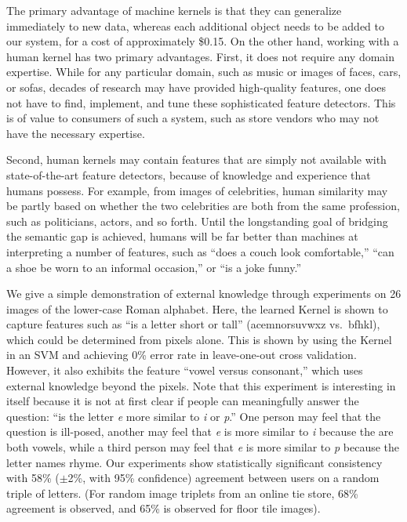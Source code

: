 \documentclass{article}
\begin{document}
The primary advantage of machine kernels is that they can generalize immediately to new data, whereas each additional object needs to be added to our system, for a cost of approximately \$0.15.  On the other hand, working with a human kernel has two primary advantages.  First, it does not require any domain expertise.  While for any particular domain, such as music or images of faces, cars, or sofas, decades of research may have provided high-quality features, one does not have to find, implement, and tune these sophisticated feature detectors.  This is of value to consumers of such a system, such as store vendors who may not have the necessary expertise.

Second, human kernels may contain features that are simply not available with state-of-the-art feature detectors, because of knowledge and experience that humans possess.  For example, from images of celebrities, human similarity may be partly based on whether the two celebrities are both from the same profession, such as politicians, actors, and so forth.  Until the longstanding goal of bridging the semantic gap is achieved, humans will be far better than machines at interpreting a number of features, such as ``does a couch look comfortable,'' ``can a shoe be worn to an informal occasion,'' or ``is a joke funny.''

We give a simple demonstration of external knowledge through
experiments on 26 images of the lower-case Roman alphabet.  Here, the
learned Kernel is shown to capture features such as ``is a letter
short or tall'' (acemnorsuvwxz vs.\ bfhkl), which could be determined
from pixels alone. This is shown by using the Kernel in an SVM and
achieving 0\% error rate in leave-one-out cross validation.  However,
it also exhibits the feature ``vowel versus consonant,'' which uses
external knowledge beyond the pixels.  Note that this experiment is
interesting in itself because it is not at first clear if people can
meaningfully answer the question: ``is the letter {\em e} more similar
to {\em i} or {\em p}.'' One person may feel that the question is
ill-posed, another may feel that {\em e} is more similar to {\em i}
because the are both vowels, while a third person may feel that {\em
  e} is more similar to {\em p} because the letter names rhyme.  Our
experiments show statistically significant consistency with 58\%
($\pm$2\%, with 95\% confidence) agreement between users on a random
triple of letters.  (For random image triplets from an online tie
store, 68\% agreement is observed, and 65\% is observed for floor tile images).
\end{document}
